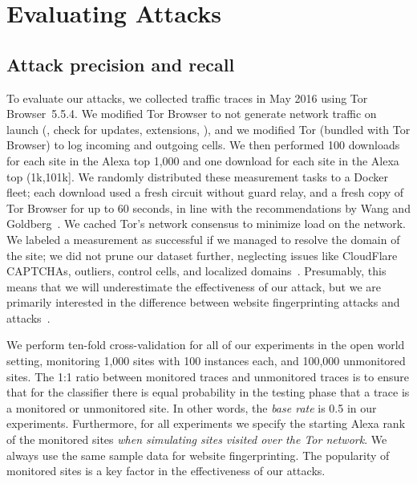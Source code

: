 \section{Evaluating \name Attacks}
\label{sec:analysis}

\subsection{Attack precision and recall}

To evaluate our \name attacks, we collected traffic traces in May
2016 using Tor Browser~5.5.4.
We modified Tor Browser to not generate network traffic on launch
(\ie, check for
updates, extensions, \etc), and we modified
Tor (bundled with Tor Browser) to log incoming and outgoing cells.
We then performed 100 downloads for each site in the Alexa top
1,000 and one download for each site in the
Alexa top (1k,101k]. We randomly distributed these measurement tasks
to a Docker fleet; each download used a fresh circuit without
guard relay, and a fresh copy of Tor Browser for up to 60 seconds,
in line with the recommendations by Wang and Goldberg~\cite[\S~4]{Wang2013a}.
We cached Tor's network consensus to minimize load on the
network.  We labeled a measurement as successful if we managed to
resolve the domain of the site; we did not prune our dataset further, neglecting
issues like CloudFlare CAPTCHAs, outliers, control cells, and localized
domains~\cite{Juarez2014a}.  Presumably, this means that we will underestimate
the effectiveness of our attack, but we are primarily interested in the
difference between website fingerprinting attacks and \name
attacks~\cite{Wang2013a}.

We perform ten-fold cross-validation for all of our experiments in the open
world setting, monitoring 1,000 sites with 100 instances each, and
100,000 unmonitored sites.
The 1:1 ratio between monitored traces and unmonitored traces is to
ensure that for the classifier there is equal probability in the testing
phase that a trace is a monitored or unmonitored site.
In other words, the \emph{base rate} is 0.5 in our experiments.
Furthermore, for all experiments we specify the starting Alexa rank of the
monitored sites
\emph{when simulating sites visited over the Tor network}.
We always use the same sample data for website fingerprinting.
The popularity of monitored sites
is a key factor in the effectiveness of our attacks.

